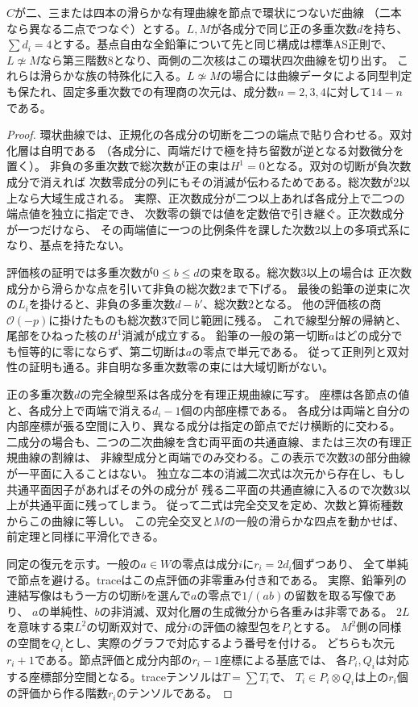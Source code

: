 \begin{proposition}[有理曲線の環状境界]\label{prop:elliptic-pencil-polygons}
$C$が二、三または四本の滑らかな有理曲線を節点で環状につないだ曲線
（二本なら異なる二点でつなぐ）とする。$L,M$が各成分で同じ正の多重次数$d$を持ち、
$\sum d_i=4$とする。基点自由な全鉛筆について先と同じ構成は標準AS正則で、
$L\not\simeq M$なら第三階数8となり、両側の二次核はこの環状四次曲線を切り出す。
これらは滑らかな族の特殊化に入る。$L\not\simeq M$の場合には曲線データによる同型判定も保たれ、固定多重次数での有理商の次元は、成分数$n=2,3,4$に対して$14-n$である。
\end{proposition}
\begin{proof}
環状曲線では、正規化の各成分の切断を二つの端点で貼り合わせる。双対化層は自明である
（各成分に、両端だけで極を持ち留数が逆となる対数微分を置く）。
非負の多重次数で総次数が正の束は$H^1=0$となる。双対の切断が負次数成分で消えれば
次数零成分の列にもその消滅が伝わるためである。総次数が2以上なら大域生成される。
実際、正次数成分が二つ以上あれば各成分上で二つの端点値を独立に指定でき、
次数零の鎖では値を定数倍で引き継ぐ。正次数成分が一つだけなら、
その両端値に一つの比例条件を課した次数2以上の多項式系になり、基点を持たない。

評価核の証明では多重次数が$0\le b\le d$の束を取る。総次数3以上の場合は
正次数成分から滑らかな点を引いて非負の総次数2まで下げる。
最後の鉛筆の逆束に次の$L_i$を掛けると、非負の多重次数$d-b'$、総次数2となる。
他の評価核の商$\mathcal O(-p)$に掛けたものも総次数3で同じ範囲に残る。
これで線型分解の帰納と、尾部をひねった核の$H^1$消滅が成立する。
鉛筆の一般の第一切断$a$はどの成分でも恒等的に零にならず、第二切断は$a$の零点で単元である。
従って正則列と双対性の証明も通る。非自明な多重次数零の束には大域切断がない。

正の多重次数$d$の完全線型系は各成分を有理正規曲線に写す。
座標は各節点の値と、各成分上で両端で消える$d_i-1$個の内部座標である。
各成分は両端と自分の内部座標が張る空間に入り、異なる成分は指定の節点でだけ横断的に交わる。
二成分の場合も、二つの二次曲線を含む両平面の共通直線、または三次の有理正規曲線の割線は、
非線型成分と両端でのみ交わる。この表示で次数3の部分曲線が一平面に入ることはない。
独立な二本の消滅二次式は次元から存在し、もし共通平面因子があればその外の成分が
残る二平面の共通直線に入るので次数3以上が共通平面に残ってしまう。
従って二式は完全交叉を定め、次数と算術種数からこの曲線に等しい。
この完全交叉と$M$の一般の滑らかな四点を動かせば、前定理と同様に平滑化できる。

同定の復元を示す。一般の$a\in W$の零点は成分$i$に$r_i=2d_i$個ずつあり、
全て単純で節点を避ける。traceはこの点評価の非零重み付き和である。
実際、鉛筆列の連結写像はもう一方の切断$b$を選んで$a$の零点で$1/(ab)$の留数を取る写像であり、
$a$の単純性、$b$の非消滅、双対化層の生成微分から各重みは非零である。
$2L$を意味する束$L^2$の切断双対で、成分$i$の評価の線型包を$P_i$とする。
$M^2$側の同様の空間を$Q_i$とし、実際のグラフで対応するよう番号を付ける。
どちらも次元$r_i+1$である。節点評価と成分内部の$r_i-1$座標による基底では、
各$P_i,Q_i$は対応する座標部分空間となる。traceテンソルは$T=\sum T_i$で、
$T_i\in P_i\otimes Q_i$は上の$r_i$個の評価から作る階数$r_i$のテンソルである。


\end{proof}
